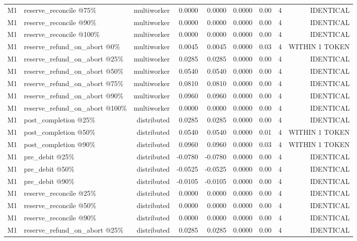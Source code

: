 \begin{table}[t]
{\begin{tabular}{llrrrrrrr}
M1 & reserve\_reconcile @75\% & multiworker & 0.0000 & 0.0000 & 0.0000 & 0.00 & 4 & IDENTICAL \\
M1 & reserve\_reconcile @90\% & multiworker & 0.0000 & 0.0000 & 0.0000 & 0.00 & 4 & IDENTICAL \\
M1 & reserve\_reconcile @100\% & multiworker & 0.0000 & 0.0000 & 0.0000 & 0.00 & 4 & IDENTICAL \\
M1 & reserve\_refund\_on\_abort @0\% & multiworker & 0.0045 & 0.0045 & 0.0000 & 0.03 & 4 & WITHIN 1 TOKEN \\
M1 & reserve\_refund\_on\_abort @25\% & multiworker & 0.0285 & 0.0285 & 0.0000 & 0.00 & 4 & IDENTICAL \\
M1 & reserve\_refund\_on\_abort @50\% & multiworker & 0.0540 & 0.0540 & 0.0000 & 0.00 & 4 & IDENTICAL \\
M1 & reserve\_refund\_on\_abort @75\% & multiworker & 0.0810 & 0.0810 & 0.0000 & 0.00 & 4 & IDENTICAL \\
M1 & reserve\_refund\_on\_abort @90\% & multiworker & 0.0960 & 0.0960 & 0.0000 & 0.00 & 4 & IDENTICAL \\
M1 & reserve\_refund\_on\_abort @100\% & multiworker & 0.0000 & 0.0000 & 0.0000 & 0.00 & 4 & IDENTICAL \\
M1 & post\_completion @25\% & distributed & 0.0285 & 0.0285 & 0.0000 & 0.00 & 4 & IDENTICAL \\
M1 & post\_completion @50\% & distributed & 0.0540 & 0.0540 & 0.0000 & 0.01 & 4 & WITHIN 1 TOKEN \\
M1 & post\_completion @90\% & distributed & 0.0960 & 0.0960 & 0.0000 & 0.03 & 4 & WITHIN 1 TOKEN \\
M1 & pre\_debit @25\% & distributed & -0.0780 & -0.0780 & 0.0000 & 0.00 & 4 & IDENTICAL \\
M1 & pre\_debit @50\% & distributed & -0.0525 & -0.0525 & 0.0000 & 0.00 & 4 & IDENTICAL \\
M1 & pre\_debit @90\% & distributed & -0.0105 & -0.0105 & 0.0000 & 0.00 & 4 & IDENTICAL \\
M1 & reserve\_reconcile @25\% & distributed & 0.0000 & 0.0000 & 0.0000 & 0.00 & 4 & IDENTICAL \\
M1 & reserve\_reconcile @50\% & distributed & 0.0000 & 0.0000 & 0.0000 & 0.00 & 4 & IDENTICAL \\
M1 & reserve\_reconcile @90\% & distributed & 0.0000 & 0.0000 & 0.0000 & 0.00 & 4 & IDENTICAL \\
M1 & reserve\_refund\_on\_abort @25\% & distributed & 0.0285 & 0.0285 & 0.0000 & 0.00 & 4 & IDENTICAL \\

\end{tabular}}
\end{table}
